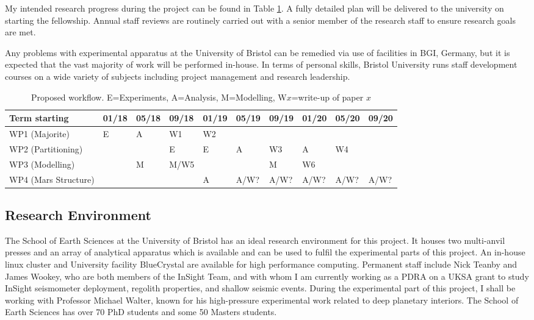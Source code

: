 \documentclass[11pt,twoside,a4paper]{article}
\begin{document}
My intended research progress during the project can be found in Table \ref{workflow}. A fully detailed plan will be delivered to the university on starting the fellowship. Annual staff reviews are routinely carried out with a senior member of the research staff to ensure research goals are met. 

Any problems with experimental apparatus at the University of Bristol can be remedied via use of facilities in BGI, Germany, but it is expected that the vast majority of work will be performed in-house. In terms of personal skills, Bristol University runs staff development courses on a wide variety of subjects including project management and research leadership.

\begin{table}[!h]
\centering
\caption{Proposed workflow. E=Experiments, A=Analysis, M=Modelling, W$x$=write-up of paper $x$}
\label{workflow}
\begin{tabular}{l|lll|lll|lll}
  Term starting        & 01/18 & 05/18 & 09/18 & 01/19 & 05/19 & 09/19 & 01/20 & 05/20 & 09/20 \\
  \hline
  WP1 (Majorite)       & E          & A          & W1         & W2         &            &            &            &            &           \\
  WP2 (Partitioning)   &            &            & E          & E          & A          & W3         & A          & W4         &           \\
  WP3 (Modelling)      &            & M          & M/W5       &            &            & M          & W6         &            &           \\
  WP4 (Mars Structure) &            &            &            & A          & A/W?       & A/W?       & A/W?       & A/W?       & A/W?     
\end{tabular}
\end{table}






\subsection*{Research Environment}
The School of Earth Sciences at the University of Bristol has an ideal research environment for this project. It houses two multi-anvil presses and an array of analytical apparatus which is available and can be used to fulfil the experimental parts of this project. An in-house linux cluster and University facility BlueCrystal are available for high performance computing. Permanent staff include Nick Teanby and James Wookey, who are both members of the InSight Team, and with whom I am currently working as a PDRA on a UKSA grant to study InSight seismometer deployment, regolith properties, and shallow seismic events. During the experimental part of this project, I shall be working with Professor Michael Walter, known for his high-pressure experimental work related to deep planetary interiors. The School of Earth Sciences has over 70 PhD students and some 50 Masters students.
\end{document}
